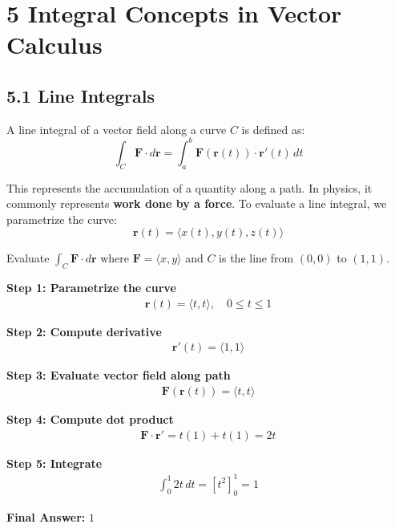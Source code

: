 \section*{5 Integral Concepts in Vector Calculus}

\subsection*{5.1 Line Integrals}
\begin{conceptbox}
    A line integral of a vector field along a curve $C$ is defined as:
    \begin{equation*}
        \int_C \mathbf{F} \cdot d\mathbf{r} = \int_a^b \mathbf{F}(\mathbf{r}(t)) \cdot \mathbf{r}'(t)\, dt
    \end{equation*}
\end{conceptbox}
This represents the accumulation of a quantity along a path. In physics, it commonly represents \textbf{work done by a force}.
\newline
To evaluate a line integral, we parametrize the curve:
\begin{equation*}
    \mathbf{r}(t) = \langle x(t), y(t), z(t) \rangle
\end{equation*}
\begin{examplebox}
    Evaluate $\int_C \mathbf{F} \cdot d\mathbf{r}$ where $\mathbf{F}=\langle x,y\rangle$ and $C$ is the line from $(0,0)$ to $(1,1)$.

    \textbf{Step 1: Parametrize the curve}
    \begin{align*}
        \mathbf{r}(t) = \langle t,t \rangle, \quad 0 \le t \le 1
    \end{align*}

    \textbf{Step 2: Compute derivative}
    \begin{align*}
        \mathbf{r}'(t) = \langle 1,1 \rangle
    \end{align*}

    \textbf{Step 3: Evaluate vector field along path}
    \begin{align*}
        \mathbf{F}(\mathbf{r}(t)) = \langle t,t \rangle
    \end{align*}

    \textbf{Step 4: Compute dot product}
    \begin{align*}
        \mathbf{F} \cdot \mathbf{r}' = t(1) + t(1) = 2t
    \end{align*}

    \textbf{Step 5: Integrate}
    \begin{align*}
        \int_0^1 2t\, dt = \left[t^2\right]_0^1 = 1
    \end{align*}

    \textbf{Final Answer:} $\boxed{1}$
\end{examplebox}
